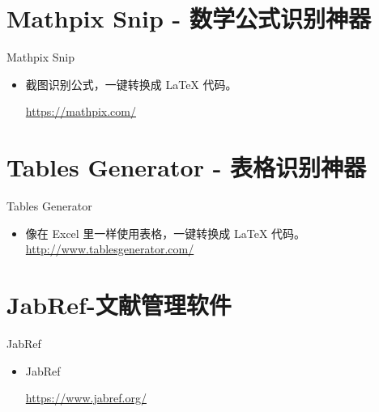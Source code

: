 \documentclass[13pt]{ctexbeamer}
\begin{document}
\section{Mathpix Snip - 数学公式识别神器}
\begin{frame}{Mathpix Snip}
\begin{itemize}
	\item 截图识别公式，一键转换成 LaTeX 代码。
	
\href{https://mathpix.com/}{https://mathpix.com/}
\end{itemize}
\end{frame} 


\section{Tables Generator - 表格识别神器 }
\begin{frame}{Tables Generator }
\begin{itemize}
	\item 	 像在 Excel 里一样使用表格，一键转换成 LaTeX 代码。 
	\href{ http://www.tablesgenerator.com/}{ http://www.tablesgenerator.com/}

\end{itemize}


\end{frame}


\section{JabRef-文献管理软件}
\begin{frame}{JabRef}
\begin{itemize}
\item  JabRef

\href{https://www.jabref.org/}{https://www.jabref.org/}
\end{itemize}
\end{frame} 
\end{document}

